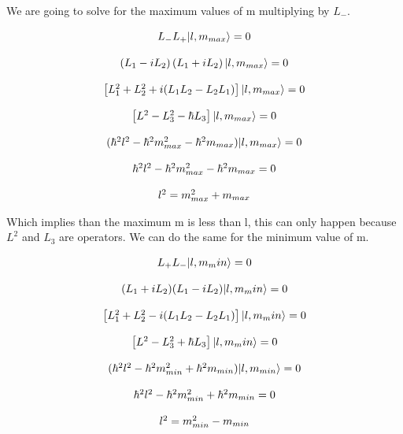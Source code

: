 We are going to solve for the maximum values of m multiplying by $L_-$.

\begin{equation}
  \begin{array}{c}
    L_- L_+ \lvert l,m_{max}\rangle = 0
    \\

    \\
    \left(L_1-iL_2\right)\left(L_1+iL_2\right)\lvert l,m_{max}\rangle = 0
    \\

    \\
    \left[L_1^2+L_2^2 + i(L_1L_2-L_2L_1)\right]\lvert l,m_{max}\rangle = 0
    \\

    \\
    \left[L^2 - L_3^2 - \hbar L_3\right]\lvert l,m_{max}\rangle = 0
    \\

    \\
    (\hbar^2 l^2 - \hbar^2 m_{max}^2 - \hbar^2 m_{max})\lvert l,m_{max}\rangle = 0
    \\

    \\
    \hbar^2 l^2 - \hbar^2 m_{max}^2 - \hbar^2 m_{max} = 0
    \\

    \\
    l^2 = m_{max}^2 + m_{max}
  \end{array}
\end{equation}

Which implies than the maximum m is less than l, this can only happen because $L^2$ and $L_3$ are operators. We can do the same for the minimum value of m.

\begin{equation}
  \begin{array}{c}
    L_+ L_- \lvert l,m_min\rangle = 0
    \\

    \\
    (L_1+iL_2)(L_1-iL_2)\lvert l,m_min\rangle = 0
    \\

    \\
    \left[L_1^2+L_2^2 - i(L_1L_2-L_2L_1)\right]\lvert l,m_min\rangle = 0
    \\

    \\
    \left[L^2 - L_3^2 + \hbar L_3\right]\lvert l,m_min\rangle = 0
    \\

    \\
    (\hbar^2 l^2 - \hbar^2 m_{min}^2 + \hbar^2 m_{min})\lvert l,m_{min}\rangle = 0
    \\

    \\
    \hbar^2 l^2 - \hbar^2 m_{min}^2 + \hbar^2 m_{min} = 0
    \\

    \\
    l^2 = m_{min}^2 - m_{min}
  \end{array}
\end{equation}

